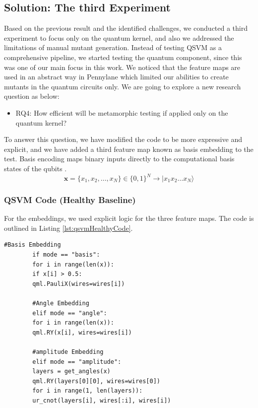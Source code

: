 \documentclass[12pt,a4paper]{article}
\begin{document}
	\subsection{Solution: The third Experiment}
	Based on the previous result and the identified challenges, we conducted a third experiment to focus only on the quantum kernel, and also we addressed the limitations of manual mutant generation. Instead of testing QSVM as a comprehensive pipeline, we started testing the quantum component, since this was one of our main focus in this work. We noticed that the feature maps are used in an abstract way in Pennylane which limited our abilities to create mutants in the quantum circuits only. We are going to explore a new research question as below:
	
	\begin{itemize}
		\item RQ4: How efficient will be metamorphic testing if applied only on the quantum kernel?
	\end{itemize}
	
	 To answer this question, we have modified the code to be more expressive and explicit, and we have added a third feature map known as basis embedding to the test. Basis encoding maps binary inputs directly to the computational basis states of the qubits \cite{schuld2018}.
	$$ \mathbf{x} = \{x_1, x_2, \dots, x_N\} \in \{0,1\}^N \rightarrow |x_1 x_2 \dots x_N\rangle $$
	
	\subsubsection{QSVM Code (Healthy Baseline)}
	For the embeddings, we used explicit logic for the three feature maps. The code is outlined in Listing \ref{lst:qsvmHealthyCode}.
	
	\begin{lstlisting}[caption=Standard QSVM Script (Explicit Embedding Logic), label={lst:qsvmHealthyCode}]
		#Basis Embedding
		if mode == "basis":
		for i in range(len(x)):
		if x[i] > 0.5: 
		qml.PauliX(wires=wires[i])
		
		#Angle Embedding
		elif mode == "angle":
		for i in range(len(x)):
		qml.RY(x[i], wires=wires[i])
		
		#amplitude Embedding		
		elif mode == "amplitude":
		layers = get_angles(x)
		qml.RY(layers[0][0], wires=wires[0])
		for i in range(1, len(layers)): 
		ur_cnot(layers[i], wires[:i], wires[i])
	\end{lstlisting}
	
\end{document}
